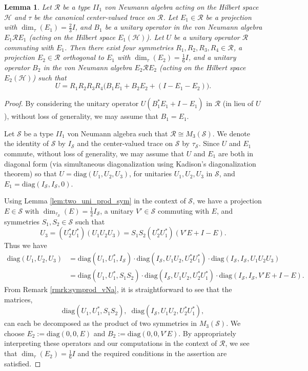 \documentclass[12pt, preprint]{amsart}
\newtheorem{lem}[thm]{Lemma}
\theoremstyle{definition}
\theoremstyle{remark}
\numberwithin{equation}{section}
\theoremstyle{ser}
\theoremstyle{serr}
\theoremstyle{ser}
\begin{document}
\begin{lem}
\label{lem:four_sym_eps}
\textsl{
Let $\mathscr{R}$ be a type $II_1$ von Neumann algebra acting on the Hilbert space $\mathscr{H}$ and $\tau$ be the canonical center-valued trace on $\mathscr{R}$. Let $E_1 \in \mathscr{R}$ be a projection with $\dim _{\tau} (E_1) = \frac{2}{3} I$, and $B_1$ be a unitary operator in the von Neumann algebra $E_1 \mathscr{R} E_1$ (acting on the Hilbert space $E_1(\mathscr{H})$). Let $U$ be a unitary operator $\mathscr{R}$ commuting with $E_1$. Then there exist four symmetries $R_1, R_2, R_3, R_4 \in \mathscr{R}$, a projection $E_2 \in \mathscr{R}$ orthogonal to $E_1$ with $\dim _{\tau} (E_2) = \frac{1}{6} I$, and a unitary operator $B_2$ in the von Neumann algebra $E_2 \mathscr{R} E_2$ (acting on the Hilbert space $E_2(\mathscr{H})$) such that $$U = R_1 R_2 R_3 R_4 \big(B_1  E_1  + B_2 E_2 +  (I - E_1 - E_2) \big).$$
}
\end{lem}
\begin{proof}
By considering the unitary operator $U(B_1 ^*E_1 + I-E_1)$ in $\mathscr{R}$ (in lieu of $U$), without loss of generality, we may assume that $B_1 = E_1$.

Let $\mathscr{S}$ be a type $II_1$ von Neumann algebra such that $\mathscr{R} \cong M_3(\mathscr{S})$. We denote the identity of $\mathscr{S}$ by $I_{\mathscr{S}}$ and the center-valued trace on $\mathscr{S}$ by $\tau_{\mathscr{S}}$. Since $U$ and $E_1$ commute, without loss of generality, we may assume that $U$ and $E_1$ are both in diagonal form (via simultaneous diagonalization using Kadison's diagonalization theorem) so that $U = \mathrm{diag}(U_1, U_2, U_3)$, for unitaries $U_1, U_2, U_3$ in $\mathscr{S}$, and $E_1 = \mathrm{diag}(I_{\mathscr{S}}, I_{\mathscr{S}}, 0)$.

Using Lemma \ref{lem:two_uni_prod_sym} in the context of $\mathscr{S}$, we have a  projection $E \in \mathscr{S}$ with $\dim _{\tau_{\mathscr{S}}} (E) = \frac{1}{2} I_{\mathscr{S}}$, a unitary $V' \in \mathscr{S}$ commuting with $E$, and symmetries $S_1, S_2 \in \mathscr{S}$ such that 
$$U_3 = (U_2 ^* U_1 ^*) (U_1 U_2 U_3) = S_1 S_2 (U_2 ^* U_1 ^*) (V'E+I-E).$$
Thus we have
\begin{align*}
\mathrm{diag}(U_1, U_2, U_3) &= \mathrm{diag}(U_1, U_1 ^*, I_{\mathscr{S}}) \cdot  \mathrm{diag}(I_{\mathscr{S}}, U_1 U_2, U_2 ^* U_1^*) \cdot \mathrm{diag}(I_{\mathscr{S}}, I_{\mathscr{S}}, U_1 U_2 U_3)\\
&= \mathrm{diag}(U_1, U_1 ^*, S_1 S_2) \cdot  \mathrm{diag}(I_{\mathscr{S}}, U_1 U_2, U_2 ^* U_1^*) \cdot \mathrm{diag}(I_{\mathscr{S}}, I_{\mathscr{S}}, V'E+I-E).
\end{align*}
From Remark \ref{rmrk:symprod_vNa}, it is straightforward to see that the matrices, $$\mathrm{diag}(U_1, U_1 ^*, S_1 S_2),\;\; \mathrm{diag}(I_{\mathscr{S}}, U_1 U_2, U_2 ^* U_1^*),$$ can each be decomposed as the product of two symmetries in $M_3(\mathscr{S})$. We choose $E_2 := \mathrm{diag}(0, 0, E)$ and $B_2 := \mathrm{diag}(0, 0, V'E)$. By appropriately interpreting these operators and our computations in the context of $\mathscr{R}$, we see that $\dim _{\tau} (E_2) = \frac{1}{6}I$ and the required conditions in the assertion are satisfied.
\end{proof}
\end{document}
